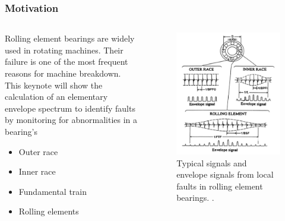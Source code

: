 


\begin{frame}
    \frametitle{Motivation}
    \small
\begin{columns}
\begin{column}{0.5\textwidth}
    Rolling element bearings are widely used in rotating machines. Their failure is one of the most frequent reasons for machine breakdown. 
    \\[1\baselineskip]
    This keynote will show the calculation of an elementary envelope spectrum to identify faults by monitoring for abnormalities in a bearing's
    \begin{itemize}
        \item Outer race
        \item Inner race 
        \item Fundamental train
        \item Rolling elements
    \end{itemize}
\end{column}
\begin{column}{0.5\textwidth}  %
    \begin{figure}
        \centering
        \includegraphics[width=\textwidth]{images/bearing.png}
        \caption{Typical signals and envelope signals from local faults in rolling element bearings. \cite{cm}.}
        \label{fig:spectrum}
    \end{figure}
\end{column}
\end{columns}
\end{frame}
